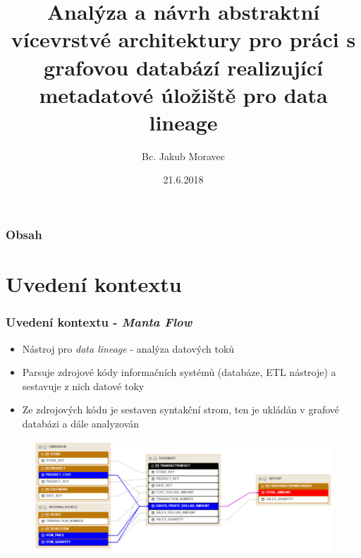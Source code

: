 \documentclass{beamer}
\title[Diplomová práce]{Analýza a návrh abstraktní vícevrstvé architektury pro práci s grafovou databází realizující metadatové úložiště pro data lineage} %
\author{Bc. Jakub Moravec} %
\institute[ČVUT] %
{
Vedoucí: Ing. Michal Valenta, Ph.D. \\
Oponent: Ing. Jiří Šebek \\
\medskip
České vysoké učení technické v Praze \\
Fakulta Elektrotechnická \\
Otevřená Informatika, Softwarové Inženýrství \\
}
\date{21.6.2018} %
\begin{document}
\begin{frame}
\titlepage
\end{frame}

\begin{frame}
\frametitle{Obsah}
\tableofcontents
\end{frame}



\section{Uvedení kontextu}
\begin{frame}
\frametitle{Uvedení kontextu - \textit{Manta Flow}}
   \begin{itemize}
      \item Nástroj pro \textit{data lineage} - analýza datových toků
      \item Parsuje zdrojové kódy informačních systémů (databáze, ETL nástroje) a sestavuje z nich datové toky
      \item Ze zdrojových kódu je sestaven syntakční strom, ten je ukládán v grafové databázi a dále analyzován
   \end{itemize}
   \begin{figure}
   \includegraphics[width=0.8\linewidth]{img/flow_visualizace}
   \end{figure}
\end{frame}
\end{document}
